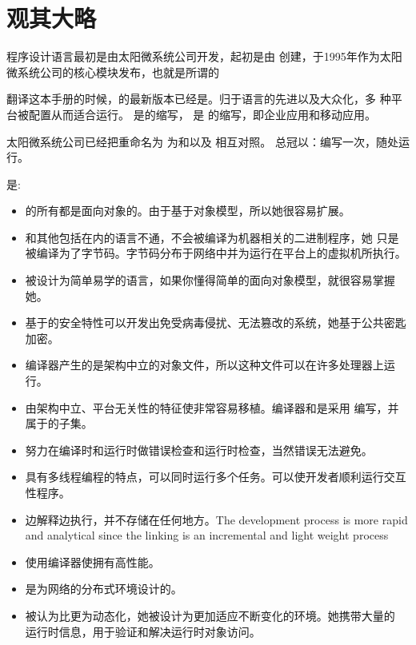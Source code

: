 \documentclass{article}
\begin{document}
\section{观其大略}
 程序设计语言最初是由太阳微系统公司开发，起初是由 创建，于1995年作为太阳
微系统公司的核心模块发布，也就是所谓的

翻译这本手册的时候，的最新版本已经是。归于语言的先进以及大众化，多
种平台被配置从而适合运行。 是的缩写， 是
的缩写，即企业应用和移动应用。

太阳微系统公司已经把重命名为 为和以及 相互对照。
总冠以：编写一次，随处运行。

是:

\begin{itemize}
\item {} 的所有都是面向对象的。由于基于对象模型，所以她很容易扩展。
\item {} 和其他包括在内的语言不通，不会被编译为机器相关的二进制程序，她
只是被编译为了字节码。字节码分布于网络中并为运行在平台上的虚拟机所执行。
\item {} 被设计为简单易学的语言，如果你懂得简单的面向对象模型，就很容易掌握她。
\item {} 基于的安全特性可以开发出免受病毒侵扰、无法篡改的系统，她基于公共密匙加密。
\item {} 编译器产生的是架构中立的对象文件，所以这种文件可以在许多处理器上运行。
\item {} 由架构中立、平台无关性的特征使非常容易移植。编译器和是采用
编写，并属于的子集。
\item {} 努力在编译时和运行时做错误检查和运行时检查，当然错误无法避免。
\item {}  具有多线程编程的特点，可以同时运行多个任务。可以使开发者顺利运行交互性程序。
\item {}  边解释边执行，并不存储在任何地方。{\textsf The development process is more rapid
and analytical since the linking is an incremental and light weight process}
\item {} 使用编译器使拥有高性能。
\item {} 是为网络的分布式环境设计的。
\item {}  被认为比更为动态化，她被设计为更加适应不断变化的环境。她携带大量的
运行时信息，用于验证和解决运行时对象访问。
\end{itemize}
\end{document}
